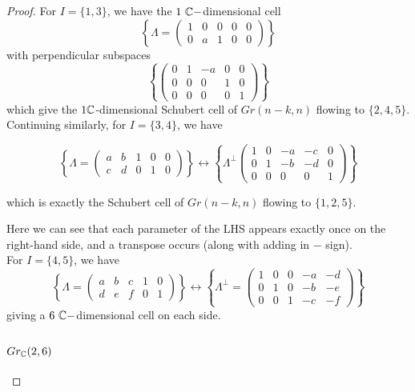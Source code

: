 \documentclass{amsart}
\begin{document}
\begin{proof}
For $I = \{1,3\}$, we have the $1 \text{ }\mathbb{C}-$dimensional cell \[ \left\{ \Lambda = \left( \begin{matrix} 1 &0 &0& 0& 0 \\ 0 &a& 1 &0& 0 \end{matrix} \right) \right\} \] with perpendicular subspaces \[ \left\{ \left( \begin{matrix} 0 & 1 & -a & 0 & 0 \\ 0 & 0 & 0 & 1 & 0 \\ 0 & 0 & 0 & 0 & 1 \end{matrix}\right) \right\} \] which give the $1 \mathbb{C}$-dimensional Schubert cell of $Gr(n-k,n)$ flowing to $\{2,4,5\}$. \\

Continuing similarly, for $I=\{3,4\}$, we have 

\[ \left\{ \Lambda = \left(\begin{matrix} a & b & 1 & 0 & 0 \\ c & d &0 &1 &0  \end{matrix}\right) \right\} \leftrightarrow \left\{ \Lambda^\perp \left( \begin{matrix} 1 & 0 & -a & -c & 0 \\ 0 & 1 & -b & -d & 0 \\ 0 &0 &0 &0 &1 \end{matrix} \right) \right\}  \]

which is exactly the Schubert cell of $Gr(n-k,n)$ flowing to $\{ 1,2,5\}$. 

Here we can see that each parameter of the LHS appears exactly once on the right-hand side, and a transpose occurs (along with adding in $-$ sign). \\

For $I=\{4,5\}$, we have \[ \left\{ \Lambda = \left( \begin{matrix} a &b& c& 1& 0 \\ d &e &f &0 &1 \end{matrix}\right) \right\} \leftrightarrow \left\{ \Lambda^\perp = \left( \begin{matrix} 1 &0 &0 &-a& -d \\ 0 &1 &0 &-b& -e \\ 0 &0 &1 &-c& -f \end{matrix} \right) \right\}  \] giving a $6 \text{ }\mathbb{C}-$dimensional cell on each side. \\

\subsubsection{$Gr_{\mathbb{C}}(2,6)$} 


\end{proof}
\end{document}
